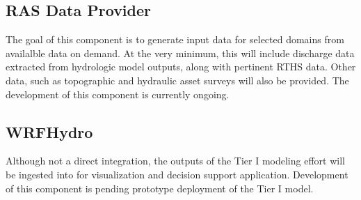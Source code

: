 \documentclass[letterpaper,12pt,english,openany,oneside]{sphinxmanual}
\begin{document}
\subsection{RAS Data Provider}
\label{\detokenize{euidev/integrations/index:ras-data-provider}}
\sphinxAtStartPar
The goal of this component is to generate  input data for selected domains from  availalble data on demand.  At the very minimum, this will include discharge data extracted from hydrologic model outputs, along with pertinent RTHS data. Other data, such as topographic and hydraulic asset surveys will also be provided. The development of this component is currently on\sphinxhyphen{}going.


\subsection{WRF\sphinxhyphen{}Hydro}
\label{\detokenize{euidev/integrations/index:wrf-hydro}}
\sphinxAtStartPar
Although not a direct integration, the outputs of the Tier I modeling effort will be ingested into  for visualization and decision support application.  Development of this component is pending prototype deployment of the Tier I model.

\sphinxstepscope
\end{document}
